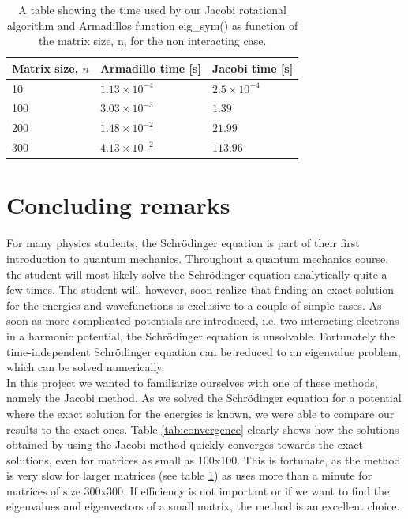 \documentclass[12pt]{article}
\numberwithin{figure}{section}
\numberwithin{table}{section}
\begin{document}
\begin{table}[h]
\begin{center}
  \begin{tabular}{| l | l | l |}
  \hline
    Matrix size, $n$ & Armadillo time [s] & Jacobi time [s] \\[0.10cm] \hline
    10 & $1.13\times 10^{-4}$ & $2.5\times 10^{-4}$ \\[0.10cm]
    100 & $3.03\times 10^{-3}$ & $1.39$ \\[0.10cm]
    200 & $1.48\times 10^{-2}$ & $21.99$ \\[0.10cm]
    300 & $4.13\times 10^{-2}$ & $113.96$ \\[0.10cm]
    \hline
  \end{tabular}
\end{center}
\caption{A table showing the time used by our Jacobi rotational algorithm and Armadillos function eig\_sym() as function of the matrix size, n, for the non interacting case.}
\label{tab:time}
\end{table}

\section{Concluding remarks}
\noindent For many physics students, the Schrödinger equation is part of their first introduction to quantum mechanics. Throughout a quantum mechanics course, the student will most likely solve the Schrödinger equation analytically quite a few times. The student will, however, soon realize that finding an exact solution for the energies and wavefunctions is exclusive to a couple of simple cases. As soon as more complicated potentials are introduced, i.e. two interacting electrons in a harmonic potential, the Schrödinger equation is unsolvable. Fortunately the time-independent Schrödinger equation can be reduced to an eigenvalue problem, which can be solved numerically.\\

\noindent In this project we wanted to familiarize ourselves with one of these methods, namely the Jacobi method. As we solved the Schrödinger equation for a potential where the exact solution for the energies is known, we were able to compare our results to the exact ones. Table \ref{tab:convergence} clearly shows how the solutions obtained by using the Jacobi method quickly converges towards the exact solutions, even for matrices as small as 100x100. This is fortunate, as the method is very slow for larger matrices (see table \ref{tab:time}) as uses more than a minute for matrices of size 300x300. If efficiency is not important or if we want to find the eigenvalues and eigenvectors of a small matrix, the method is an excellent choice. \\
\end{document}
